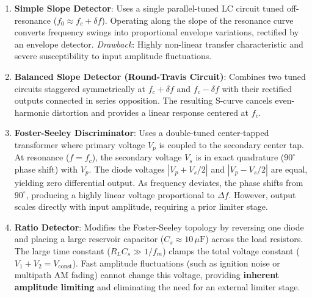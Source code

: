 \documentclass[12pt,a4paper]{article}
\begin{document}
\begin{enumerate}[leftmargin=1.5em, itemsep=3pt]
  \item \textbf{Simple Slope Detector}: Uses a single parallel-tuned LC circuit tuned off-resonance ($f_0 \approx f_c + \delta f$). Operating along the slope of the resonance curve converts frequency swings into proportional envelope variations, rectified by an envelope detector. \textit{Drawback}: Highly non-linear transfer characteristic and severe susceptibility to input amplitude fluctuations.
  \item \textbf{Balanced Slope Detector (Round-Travis Circuit)}: Combines two tuned circuits staggered symmetrically at $f_c + \delta f$ and $f_c - \delta f$ with their rectified outputs connected in series opposition. The resulting S-curve cancels even-harmonic distortion and provides a linear response centered at $f_c$.
  \item \textbf{Foster-Seeley Discriminator}: Uses a double-tuned center-tapped transformer where primary voltage $V_p$ is coupled to the secondary center tap. At resonance ($f = f_c$), the secondary voltage $V_s$ is in exact quadrature ($90^\circ$ phase shift) with $V_p$. The diode voltages $|V_p + V_s/2|$ and $|V_p - V_s/2|$ are equal, yielding zero differential output. As frequency deviates, the phase shifts from $90^\circ$, producing a highly linear voltage proportional to $\Delta f$. However, output scales directly with input amplitude, requiring a prior limiter stage.
  \item \textbf{Ratio Detector}: Modifies the Foster-Seeley topology by reversing one diode and placing a large reservoir capacitor ($C_s \approx 10\,\mu\mathrm{F}$) across the load resistors. The large time constant ($R_LC_s \gg 1/f_m$) clamps the total voltage constant ($V_1 + V_2 = V_{\mathrm{const}}$). Fast amplitude fluctuations (such as ignition noise or multipath AM fading) cannot change this voltage, providing \textbf{inherent amplitude limiting} and eliminating the need for an external limiter stage.
\end{enumerate}
\end{document}
